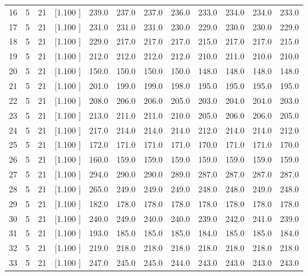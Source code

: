 \documentclass[12pt,a4paper]{article}
\begin{document}
\begin{center}
{\begin{tabular}{r r r r r r r r r r r r}
  16&  5& 21&[1.100     ]&   239.0&   237.0&   237.0&   236.0&   233.0&   234.0&   234.0&   233.0\\[-0.02in]
  17&  5& 21&[1.100     ]&   231.0&   231.0&   231.0&   230.0&   229.0&   230.0&   230.0&   229.0\\[-0.02in]
  18&  5& 21&[1.100     ]&   229.0&   217.0&   217.0&   217.0&   215.0&   217.0&   217.0&   215.0\\[-0.02in]
  19&  5& 21&[1.100     ]&   212.0&   212.0&   212.0&   212.0&   210.0&   211.0&   210.0&   210.0\\[-0.02in]
  20&  5& 21&[1.100     ]&   150.0&   150.0&   150.0&   150.0&   148.0&   148.0&   148.0&   148.0\\[-0.02in]
  21&  5& 21&[1.100     ]&   201.0&   199.0&   199.0&   198.0&   195.0&   195.0&   195.0&   195.0\\[-0.02in]
  22&  5& 21&[1.100     ]&   208.0&   206.0&   206.0&   205.0&   203.0&   204.0&   204.0&   203.0\\[-0.02in]
  23&  5& 21&[1.100     ]&   213.0&   211.0&   211.0&   210.0&   205.0&   206.0&   206.0&   205.0\\[-0.02in]
  24&  5& 21&[1.100     ]&   217.0&   214.0&   214.0&   214.0&   212.0&   214.0&   214.0&   212.0\\[-0.02in]
  25&  5& 21&[1.100     ]&   172.0&   171.0&   171.0&   171.0&   170.0&   171.0&   171.0&   170.0\\[-0.02in]
  26&  5& 21&[1.100     ]&   160.0&   159.0&   159.0&   159.0&   159.0&   159.0&   159.0&   159.0\\[-0.02in]
  27&  5& 21&[1.100     ]&   294.0&   290.0&   290.0&   289.0&   287.0&   287.0&   287.0&   287.0\\[-0.02in]
  28&  5& 21&[1.100     ]&   265.0&   249.0&   249.0&   249.0&   248.0&   248.0&   249.0&   248.0\\[-0.02in]
  29&  5& 21&[1.100     ]&   182.0&   178.0&   178.0&   178.0&   178.0&   178.0&   178.0&   178.0\\[-0.02in]
  30&  5& 21&[1.100     ]&   240.0&   249.0&   240.0&   240.0&   239.0&   242.0&   241.0&   239.0\\[-0.02in]
  31&  5& 21&[1.100     ]&   193.0&   185.0&   185.0&   185.0&   184.0&   185.0&   185.0&   184.0\\[-0.02in]
  32&  5& 21&[1.100     ]&   219.0&   218.0&   218.0&   218.0&   218.0&   218.0&   218.0&   218.0\\[-0.02in]
  33&  5& 21&[1.100     ]&   247.0&   245.0&   245.0&   244.0&   243.0&   243.0&   243.0&   243.0\\[-0.02in]

\end{tabular}}
\end{center}
\end{document}
